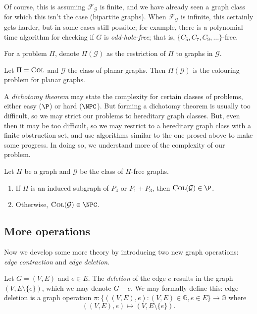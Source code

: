 Of course, this is assuming $\mathcal F_{\mathcal G}$ is finite, and we have already seen a graph class for which this isn't the case (bipartite graphs). When $\mathcal F_{\mathcal G}$ is infinite, this certainly gets harder, but in some cases still possible; for example, there is a polynomial time algorithm for checking if $G$ is \emph{odd-hole-free}; that is, $\{C_5, C_7, C_9, \ldots\}$-free.

\begin{definition}[Restriction]
  For a problem $\Pi$, denote $\Pi(\mathcal G)$ as the restriction of $\Pi$ to graphs in $\mathcal G$.
\end{definition}

\begin{example}
  Let $\Pi = \text{\normalfont \textsc{Col}}$ and $\mathcal G$ the class of planar graphs. Then $\Pi(\mathcal G)$ is the colouring problem for planar graphs.
\end{example}

A \emph{dichotomy theorem} may state the complexity for certain classes of problems, either easy ($\P$) or hard ($\NPC$). But forming a dichotomy theorem is usually too difficult, so we may strict our problems to hereditary graph classes. But, even then it may be too difficult, so we may restrict to a hereditary graph class with a finite obstruction set, and use algorithms similar to the one prosed above to make some progress. In doing so, we understand more of the complexity of our problem.

\begin{theorem}
  Let $H$ be a graph and $\mathcal G$ be the class of $H$-free graphs.
  \begin{enumerate}
    \item If $H$ is an induced subgraph of $P_4$ or $P_1 + P_3$, then $\mathsc{Col}(\mathcal G) \in \P$.
    \item Otherwise, $\mathsc{Col}(\mathcal G) \in \NPC$.
  \end{enumerate}
\end{theorem}

\subsection{More operations}

Now we develop some more theory by introducing two new graph operations: \emph{edge contraction} and \emph{edge deletion}.

Let $G = (V,E)$ and $e \in E$. The \emph{deletion} of the edge $e$ results in the graph $(V, E \setminus \{e\})$, which we may denote $G-e$. We may formally define this: edge deletion is a graph operation $\pi: \{((V,E), e): (V,E) \in \mathbb G, e \in E\} \to \mathbb G$ where
\[ ((V,E), e) \mapsto (V, E \setminus \{e\}). \]

